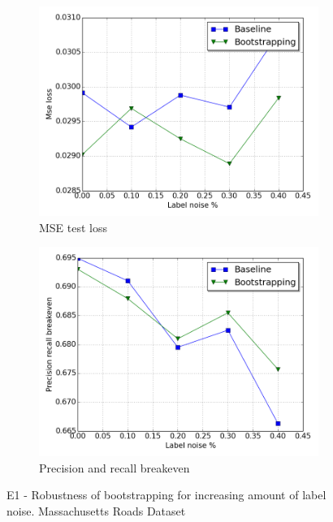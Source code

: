 \begin{figure}
\begin{subfigure}{0.48\textwidth}
\includegraphics[width=\linewidth]{figs/E1/E1-lc-noise.png}
\caption{MSE test loss} \label{fig:E1_boot_mass_loss}
\end{subfigure}
\hspace*{\fill} %
\begin{subfigure}{0.48\textwidth}
\includegraphics[width=\linewidth]{figs/E1/E1-pr-noise.png}
\caption{Precision and recall breakeven} \label{fig:E1_boot_mass_pr}
\end{subfigure}
\hspace*{\fill} %
\caption[E1 - Robustness of bootstrapping with  Massachusetts Roads Dataset]{E1 - Robustness of bootstrapping for increasing amount of label noise. Massachusetts Roads Dataset} \label{fig:E1_boot_mass}
\end{figure}

